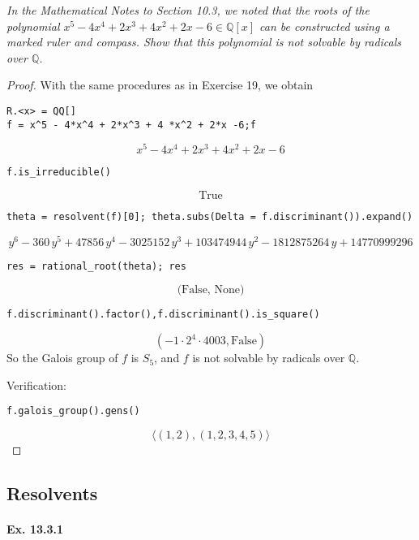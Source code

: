 \documentclass[11pt,a4paper]{article}
\newcommand{\Q}{\mathbb{Q}}
\begin{document}
{\it In the Mathematical Notes to Section 10.3, we noted that the roots of the polynomial $x^5 - 4x^4 + 2x^3 + 4x^2 + 2x - 6 \in \Q[x]$ can be constructed using a marked ruler and compass. Show that this polynomial is not solvable by radicals over $\Q$.
}

\begin{proof}
With the same procedures as in Exercise 19, we obtain
\begin{verbatim}
R.<x> = QQ[]
f = x^5 - 4*x^4 + 2*x^3 + 4 *x^2 + 2*x -6;f
\end{verbatim}
$$x^{5} - 4 x^{4} + 2 x^{3} + 4 x^{2} + 2 x - 6$$

\begin{verbatim}
f.is_irreducible()
\end{verbatim}
$$\text{True}$$

\begin{verbatim}
theta = resolvent(f)[0]; theta.subs(Delta = f.discriminant()).expand()
\end{verbatim}
$$y^{6} - 360 \, y^{5} + 47856 \, y^{4} - 3025152 \, y^{3} + 103474944 \,
y^{2} - 1812875264 \, y + 14770999296
$$
\begin{verbatim}
res = rational_root(theta); res
\end{verbatim}
$$\text{(False, None)}$$
\begin{verbatim}
f.discriminant().factor(),f.discriminant().is_square()
\end{verbatim}
$$(-1 \cdot 2^{4} \cdot 4003, \text{False})$$
So the Galois group of $f$ is $S_5$, and $f$ is not solvable by radicals over $\Q$.

Verification:
\begin{verbatim}
f.galois_group().gens()
\end{verbatim}
$$\langle (1,2), (1,2,3,4,5) \rangle
$$
\end{proof}

\subsection{Resolvents}

\paragraph{Ex. 13.3.1}
\end{document}
